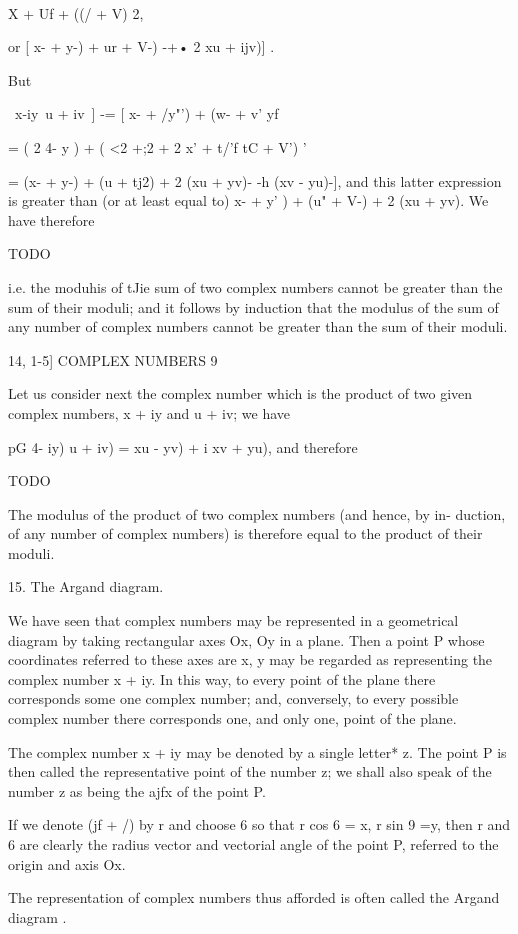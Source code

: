 \ \ {X + Uf + ((/ + V) 2,

or [ x- + y-) + ur + V-) -+• 2 xu + ijv)] .

But

 \ x-\-iy\-\-\ u + iv\ ] -= [ x- + /y"') + (w- + v' yf

= ( 2 4- y ) + ( <2 +;2 + 2 x' + t/'f tC + V') '

= (x- + y-) + (u + tj2) + 2 (xu + yv)- -h (xv - yu)-], and this
latter expression is greater than (or at least equal to) x- + y' ) +
(u" + V-) + 2 (xu + yv). We have therefore

TODO

i.e. the moduhis of tJie sum of two complex numbers cannot be greater
than the sum of their moduli; and it follows by induction that the
modulus of the sum of any number of complex numbers cannot be greater
than the sum of their moduli.

14, 1-5] COMPLEX NUMBERS 9

Let us consider next the complex number which is the product of two
given complex numbers, x + iy and u + iv; we have

 pG 4- iy) u + iv) = xu - yv) + i xv + yu), and therefore

TODO

The modulus of the product of two complex numbers (and hence, by in-
duction, of any number of complex numbers) is therefore equal to the
product of their moduli.

15. The Argand diagram.

We have seen that complex numbers may be represented in a geometrical
diagram by taking rectangular axes Ox, Oy in a plane. Then a point P
whose coordinates referred to these axes are x, y may be regarded as
representing the complex number x + iy. In this way, to every point of
the plane there corresponds some one complex number; and, conversely,
to every possible complex number there corresponds one, and only one,
point of the plane.

The complex number x + iy may be denoted by a single letter* z. The
point P is then called the representative point of the number z; we
shall also speak of the number z as being the ajfx of the point P.

If we denote (jf + /) by r and choose 6 so that r cos 6 = x, r sin 9
=y, then r and 6 are clearly the radius vector and vectorial angle of
the point P, referred to the origin and axis Ox.

The representation of complex numbers thus afforded is often called
the Argand diagram .

}
